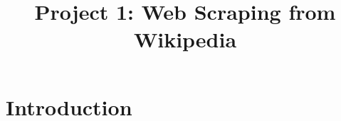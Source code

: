 \documentclass{report}
\title{Project 1: Web Scraping from Wikipedia}
\begin{document}
\maketitle

\section{Introduction}
\end{document}
